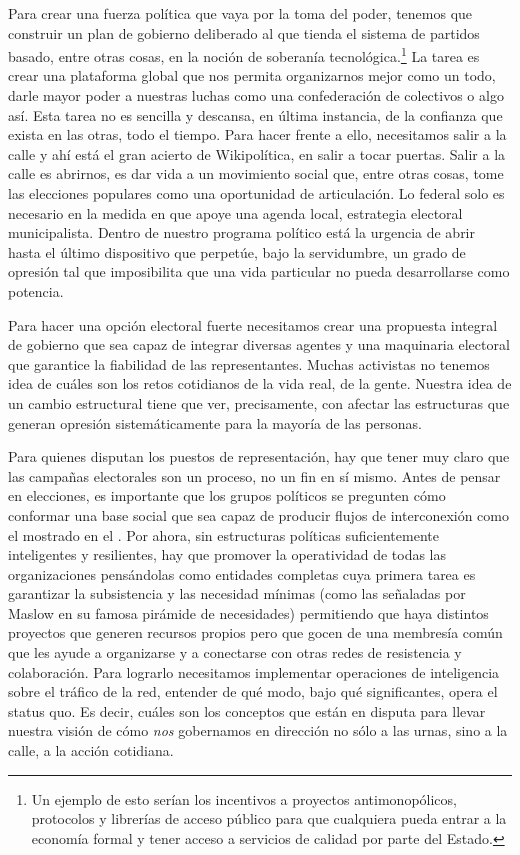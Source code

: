 Para crear una fuerza política que vaya por la toma del poder, tenemos que construir un plan de gobierno deliberado al que tienda el sistema de partidos basado, entre otras cosas, en la noción de soberanía tecnológica.\footnote{Un ejemplo de esto serían los incentivos a proyectos antimonopólicos, protocolos y librerías de acceso público para que cualquiera pueda entrar a la economía formal y tener acceso a servicios de calidad por parte del Estado.} La tarea es crear una plataforma global que nos permita organizarnos mejor como un todo, darle mayor poder a nuestras luchas como una confederación de colectivos o algo así. Esta tarea no es sencilla y descansa, en última instancia, de la confianza que exista en las otras, todo el tiempo. Para hacer frente a ello, necesitamos salir a la calle y ahí está el gran acierto de Wikipolítica, en salir a tocar puertas. Salir a la calle es abrirnos, es dar vida a un movimiento social que, entre otras cosas, tome las elecciones populares como una oportunidad de articulación. Lo federal solo es necesario en la medida en que apoye una agenda local, estrategia electoral municipalista. Dentro de nuestro programa político está la urgencia de abrir hasta el último dispositivo que perpetúe, bajo la servidumbre, un grado de opresión tal que imposibilita que una vida particular no pueda desarrollarse como potencia.

Para hacer una opción electoral fuerte necesitamos crear una propuesta integral de gobierno que sea capaz de integrar diversas agentes y una maquinaria electoral que garantice la fiabilidad de las representantes. Muchas activistas no tenemos idea de cuáles son los retos cotidianos de la vida real, de la gente. Nuestra idea de un cambio estructural tiene que ver, precisamente, con afectar las estructuras que generan opresión sistemáticamente para la mayoría de las personas.

Para quienes disputan los puestos de representación, hay que tener muy claro que las campañas electorales son un proceso, no un fin en sí mismo. Antes de pensar en elecciones, es importante que los grupos políticos se pregunten cómo conformar una base social que sea capaz de producir flujos de interconexión como el mostrado en el . Por ahora, sin estructuras políticas suficientemente inteligentes y resilientes, hay que promover la operatividad de todas las organizaciones pensándolas como entidades completas cuya primera tarea es garantizar la subsistencia y las necesidad mínimas (como las señaladas por Maslow en su famosa pirámide de necesidades) permitiendo que haya distintos proyectos que generen recursos propios pero que gocen de una membresía común que les ayude a organizarse y a conectarse con otras redes de resistencia y colaboración. Para lograrlo necesitamos implementar operaciones de inteligencia sobre el tráfico de la red, entender de qué modo, bajo qué significantes, opera el status quo. Es decir, cuáles son los conceptos que están en disputa para llevar nuestra visión de cómo \emph{nos} gobernamos en dirección no sólo a las urnas, sino a la calle, a la acción cotidiana.

